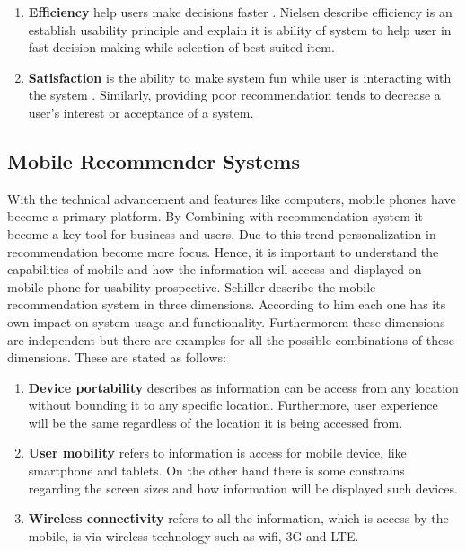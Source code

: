 \begin{enumerate}
	\item \textbf{Efficiency} help users make decisions faster \cite{tintarev2007survey}. Nielsen describe efficiency is an establish usability principle and explain it is ability of system to help user in fast decision making while selection of best suited item\cite{nielsen1990heuristic}.
	
	\item \textbf{Satisfaction} is the ability to make system fun while user is interacting with the system \cite{tintarev2007survey}. Similarly, providing poor recommendation tends to decrease a user’s interest \cite{ tanaka2000multi} or acceptance of a system\cite{herlocker2000explaining}.
	
\end{enumerate}

\subsection{Mobile Recommender Systems}

With the technical advancement and features like computers, mobile phones have become a primary platform. By Combining with recommendation system it become a key tool for business and users. Due to this trend personalization in recommendation become more focus. Hence, it is important to understand the capabilities of mobile and how the information will access and displayed on mobile phone for usability prospective\cite{nielsen1990heuristic}. Schiller \cite{schiller2003mobile} describe the mobile recommendation system in three dimensions. According to him each one has its own impact on system usage and functionality. Furthermorem these dimensions are independent but there are examples for all the possible combinations of these dimensions. These are stated as follows:

\begin{enumerate}

	\item \textbf{Device portability} describes as information can be access from any location without bounding it to any specific location. Furthermore, user experience will be the same regardless of the location it is being accessed from. 
	
	\item \textbf{User mobility} refers to information is access for mobile device, like smartphone and tablets. On the other hand there is some constrains regarding the screen sizes and how information will be displayed such devices.
	
	\item \textbf{Wireless connectivity} refers to all the information, which is access by the mobile, is via wireless technology such as wifi, 3G and LTE.
	
\end{enumerate}

